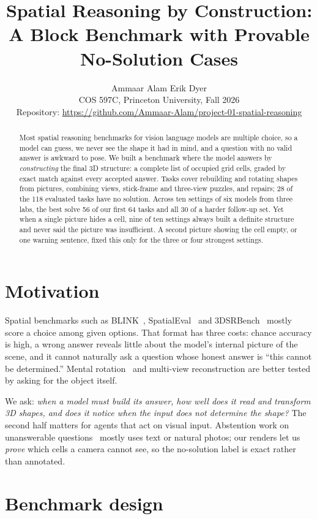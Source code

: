 \documentclass[10pt,twocolumn,letterpaper]{article}
\title{\vspace{-1.2em}Spatial Reasoning by Construction: A Block Benchmark with Provable No-Solution Cases\vspace{-0.4em}}
\author{Ammaar Alam \quad Erik Dyer\\
\small COS 597C, Princeton University, Fall 2026\\
\small Repository: \url{https://github.com/Ammaar-Alam/project-01-spatial-reasoning}}
\date{\vspace{-2em}}
\begin{document}
\maketitle

\begin{abstract}
Most spatial reasoning benchmarks for vision language models are multiple choice, so a model can guess, we never see the shape it had in mind, and a question with no valid answer is awkward to pose. We built a benchmark where the model answers by \emph{constructing} the final 3D structure: a complete list of occupied grid cells, graded by exact match against every accepted answer. Tasks cover rebuilding and rotating shapes from pictures, combining views, stick-frame and three-view puzzles, and repairs; 28 of the 118 evaluated tasks have no solution. Across ten settings of six models from three labs, the best solve 56 of our first 64 tasks and all 30 of a harder follow-up set. Yet when a single picture hides a cell, nine of ten settings always built a definite structure and never said the picture was insufficient. A second picture showing the cell empty, or one warning sentence, fixed this only for the three or four strongest settings.
\end{abstract}

\section{Motivation}
Spatial benchmarks such as BLINK~\cite{blink}, SpatialEval~\cite{spatialeval} and 3DSRBench~\cite{3dsr} mostly score a choice among given options. That format has three costs: chance accuracy is high, a wrong answer reveals little about the model's internal picture of the scene, and it cannot naturally ask a question whose honest answer is ``this cannot be determined.'' Mental rotation~\cite{shepard} and multi-view reconstruction are better tested by asking for the object itself.

We ask: \emph{when a model must build its answer, how well does it read and transform 3D shapes, and does it notice when the input does not determine the shape?} The second half matters for agents that act on visual input. Abstention work on unanswerable questions~\cite{vizwiz,abstention} mostly uses text or natural photos; our renders let us \emph{prove} which cells a camera cannot see, so the no-solution label is exact rather than annotated.

\section{Benchmark design}
\end{document}
